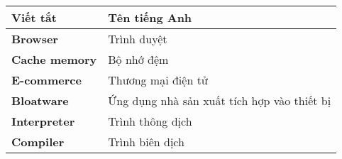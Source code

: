 \documentclass[../DoAn.tex]{subfiles}
\begin{document}
\begin{longtable}{l p{14cm}}
	\hline
   \textbf{Viết tắt}  & \textbf{Tên tiếng Anh} \\ \hline 
	\textbf{Browser} & Trình duyệt \\
	\textbf{Cache memory} & Bộ nhớ đệm \\
	\textbf{E-commerce} & Thương mại điện tử \\
	\textbf{Bloatware} & Ứng dụng nhà sản xuất tích hợp vào thiết bị \\
	\textbf{Interpreter}  &  Trình thông dịch \\
    \textbf{Compiler}  &  Trình biên dịch \\

    \hline
\end{longtable}
\end{document}
